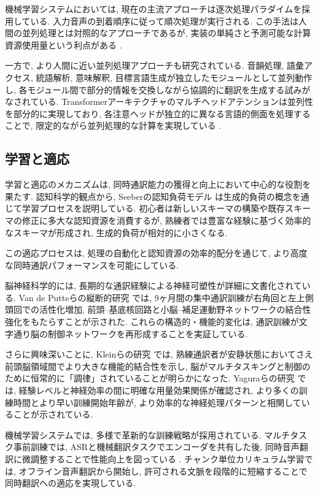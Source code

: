 機械学習システムにおいては, 現在の主流アプローチは逐次処理パラダイムを採用している.
入力音声の到着順序に従って順次処理が実行される.
この手法は人間の並列処理とは対照的なアプローチであるが, 実装の単純さと予測可能な計算資源使用量という利点がある \cite{liu2024recent}.

一方で, より人間に近い並列処理アプローチも研究されている.
音韻処理, 語彙アクセス, 統語解析, 意味解釈, 目標言語生成が独立したモジュールとして並列動作し, 各モジュール間で部分的情報を交換しながら協調的に翻訳を生成する試みがなされている.
Transformerアーキテクチャのマルチヘッドアテンションは並列性を部分的に実現しており, 各注意ヘッドが独立的に異なる言語的側面を処理することで, 限定的ながら並列処理的な計算を実現している \cite{ma2020monotonic}.

\subsection{学習と適応}

学習と適応のメカニズムは, 同時通訳能力の獲得と向上において中心的な役割を果たす.
認知科学的観点から, Seeberの認知負荷モデル \cite{seeber2011cognitive} は生成的負荷の概念を通じて学習プロセスを説明している.
初心者は新しいスキーマの構築や既存スキーマの修正に多大な認知資源を消費するが, 熟練者では豊富な経験に基づく効率的なスキーマが形成され, 生成的負荷が相対的に小さくなる.

この適応プロセスは, 処理の自動化と認知資源の効率的配分を通じて, より高度な同時通訳パフォーマンスを可能にしている.

脳神経科学的には, 長期的な通訳経験による神経可塑性が詳細に文書化されている.
Van de Putteらの縦断的研究 \cite{vandeputte2018anatomical} では, 9ヶ月間の集中通訳訓練が右角回と左上側頭回での活性化増加, 前頭--基底核回路と小脳--補足運動野ネットワークの結合性強化をもたらすことが示された.
これらの構造的・機能的変化は, 通訳訓練が文字通り脳の制御ネットワークを再形成することを実証している.

さらに興味深いことに, Kleinらの研究 \cite{klein2018interpreter} では, 熟練通訳者が安静状態においてさえ前頭脳領域間でより大きな機能的結合性を示し, 脳がマルチタスキングと制御のために恒常的に「調律」されていることが明らかになった.
Yaguraらの研究 \cite{yagura2021selective} では, 経験レベルと神経効率の間に明確な用量効果関係が確認され, より多くの訓練時間とより早い訓練開始年齢が, より効率的な神経処理パターンと相関していることが示されている.

機械学習システムでは, 多様で革新的な訓練戦略が採用されている.
マルチタスク事前訓練では, ASRと機械翻訳タスクでエンコーダを共有した後, 同時音声翻訳に微調整することで性能向上を図っている \cite{ko2024naist}.
チャンク単位カリキュラム学習では, オフライン音声翻訳から開始し, 許可される文脈を段階的に短縮することで同時翻訳への適応を実現している.

